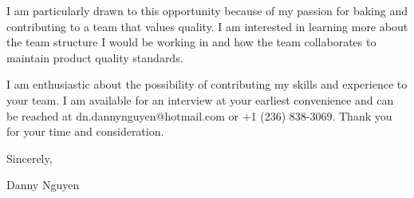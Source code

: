 \documentclass[letterpaper,11pt]{article}
\begin{document}
\vspace{10pt}
I am particularly drawn to this opportunity because of my passion for baking and contributing to a team that values quality. I am interested in learning more about the team structure I would be working in and how the team collaborates to maintain product quality standards.

\vspace{20pt}
I am enthusiastic about the possibility of contributing my skills and experience to your team. I am available for an interview at your earliest convenience and can be reached at dn.dannynguyen@hotmail.com or +1 (236) 838-3069. Thank you for your time and consideration.

Sincerely,

\vspace{40pt} %
Danny Nguyen

\end{document}
